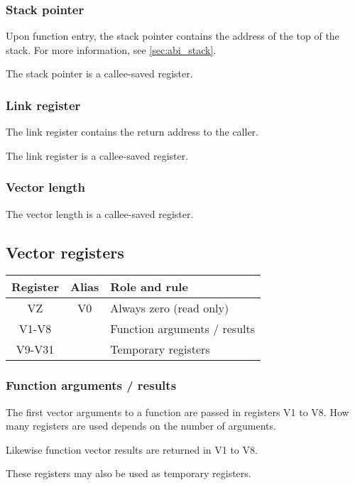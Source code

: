 \tbd

\subsubsection{Stack pointer}

Upon function entry, the stack pointer contains the address of the top of the
stack. For more information, see \ref{sec:abi_stack}.

The stack pointer is a callee-saved register.

\subsubsection{Link register}

The link register contains the return address to the caller.

The link register is a callee-saved register.

\subsubsection{Vector length}

The vector length is a callee-saved register.

\subsection{Vector registers}

\begin{tabular}{|c|c|l|}
  \hline
  \textbf{Register} & \textbf{Alias} & \textbf{Role and rule} \\
  \hline
  VZ & V0 & Always zero (read only) \\
  \hline
  V1-V8 & & Function arguments / results \\
  \hline
  V9-V31 & & Temporary registers \\
  \hline
\end{tabular}

\subsubsection{Function arguments / results}

The first vector arguments to a function are passed in registers V1 to V8. How
many registers are used depends on the number of arguments.

Likewise function vector results are returned in V1 to V8.

These registers may also be used as temporary registers.

